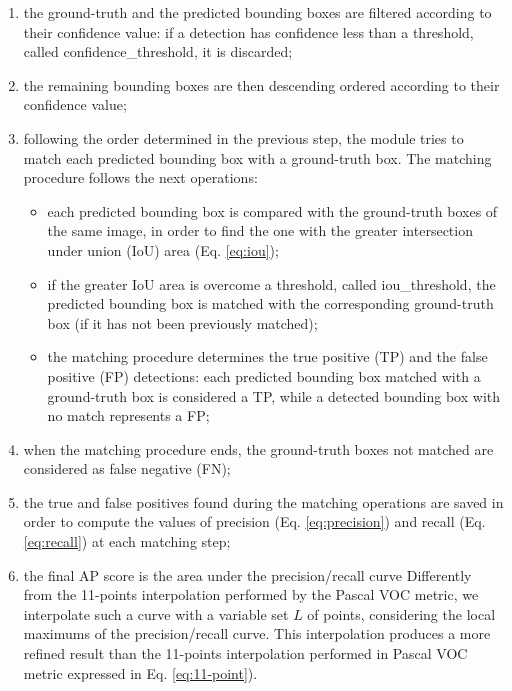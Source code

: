 \begin{enumerate}
	\item the ground-truth and the predicted bounding boxes are filtered according to their confidence value: if a detection has confidence less than a threshold, called \textsf{confidence\_threshold}, it is discarded;
	\item the remaining bounding boxes are then descending ordered according to their confidence value;
	\item  following the order determined in the previous step, the module tries to match each predicted bounding box with a  ground-truth box. The matching procedure follows the next operations:
	\begin{itemize}
		\item each predicted bounding box is compared with the  ground-truth boxes of the same image, in order to find the one with the greater intersection under union (IoU) area (Eq. \ref{eq:iou});
		\item if the greater IoU area is overcome a threshold, called \textsf{iou\_threshold}, the predicted bounding box is matched with the corresponding  ground-truth box (if it has not been previously matched);
		\item the matching procedure determines the true positive (TP) and the false positive (FP) detections: each predicted bounding box matched with a  ground-truth box is considered a TP, while a detected bounding box with no match represents a FP;
	\end{itemize}
	\item when the matching procedure ends, the  ground-truth boxes not matched  are considered as false negative (FN);
	\item the true and false positives found during the matching operations are saved in order to compute the values of precision (Eq. \ref{eq:precision}) and recall (Eq. \ref{eq:recall}) at each matching step; 
	\item the final AP score is the area under the precision/recall curve Differently from the 11-points interpolation performed by the Pascal VOC metric, we interpolate such a curve with a variable set $L$ of points, considering the local maximums of the precision/recall curve. This interpolation produces a more refined result than the 11-points interpolation performed in Pascal VOC metric expressed in Eq. \ref{eq:11-point}).
\end{enumerate} 


